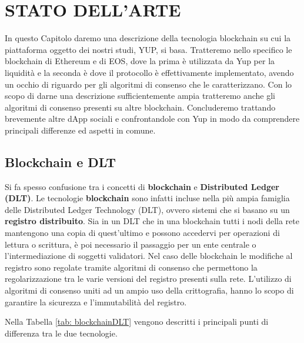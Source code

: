\chapter{STATO DELL'ARTE}
\label{chapter_background}
In questo Capitolo daremo una descrizione della tecnologia blockchain su cui la piattaforma oggetto dei nostri studi, YUP, si basa. Tratteremo nello specifico le blockchain di Ethereum e di EOS, dove la prima è utilizzata da Yup per la liquidità e la seconda è dove il protocollo è effettivamente implementato, avendo un occhio di riguardo per gli algoritmi di consenso che le caratterizzano. Con lo scopo di darne una descrizione sufficientemente ampia tratteremo anche gli algoritmi di consenso presenti su altre blockchain.
Concluderemo trattando brevemente altre dApp sociali e confrontandole con Yup in modo da comprendere principali differenze ed aspetti in comune.

\section{Blockchain e DLT}
Si fa spesso confusione tra i concetti di \textbf{blockchain} e \textbf{Distributed Ledger (DLT)}\cite{panwar2020distributed}. Le tecnologie \textbf{blockchain} sono infatti incluse nella più ampia famiglia delle Distributed Ledger Technology (DLT), ovvero sistemi che si basano su un \textbf{registro distribuito}. Sia in un DLT che in una blockchain tutti i nodi della rete mantengono una copia di quest'ultimo e possono accedervi per operazioni di lettura o scrittura, è poi necessario il passaggio per un ente centrale o l'intermediazione di soggetti validatori. Nel caso delle blockchain le modifiche al registro sono regolate tramite algoritmi di consenso che permettono la regolarizzazione tra le varie versioni del registro presenti sulla rete. L'utilizzo di algoritmi di consenso uniti ad un ampio uso della crittografia, hanno lo scopo di garantire la sicurezza e l'immutabilità del registro.

Nella Tabella \ref{tab: blockchainDLT} vengono descritti i principali punti di differenza tra le due tecnologie.

